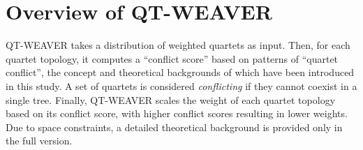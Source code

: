 \documentclass[runningheads]{llncs}
\newcommand{\addb}[1]{{\color{red} #1}}
\begin{document}

\vspace{-10pt}
\section{Overview of QT-WEAVER}
\vspace{-5pt}
QT-WEAVER takes a distribution of weighted quartets as input. Then, for each quartet topology, it computes a ``conflict score'' based on patterns of ``quartet conflict'', the concept and theoretical backgrounds of which have been introduced in this study. A set of quartets is considered \textit{conflicting} if they cannot coexist in a single tree. Finally, QT-WEAVER scales the weight of each quartet topology based on its conflict score, with higher conflict scores resulting in lower weights. Due to space constraints, a detailed theoretical background is provided only in the full version.
\end{document}
